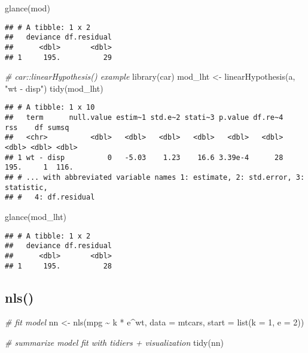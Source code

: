 \documentclass[
]{book}
\newenvironment{Shaded}{\begin{snugshade}}{\end{snugshade}}
\newcommand{\AttributeTok}[1]{\textcolor[rgb]{0.77,0.63,0.00}{#1}}
\newcommand{\CommentTok}[1]{\textcolor[rgb]{0.56,0.35,0.01}{\textit{#1}}}
\newcommand{\DecValTok}[1]{\textcolor[rgb]{0.00,0.00,0.81}{#1}}
\newcommand{\FunctionTok}[1]{\textcolor[rgb]{0.00,0.00,0.00}{#1}}
\newcommand{\NormalTok}[1]{#1}
\newcommand{\OtherTok}[1]{\textcolor[rgb]{0.56,0.35,0.01}{#1}}
\newcommand{\SpecialCharTok}[1]{\textcolor[rgb]{0.00,0.00,0.00}{#1}}
\newcommand{\StringTok}[1]{\textcolor[rgb]{0.31,0.60,0.02}{#1}}
\begin{document}
\begin{Shaded}
\begin{Highlighting}[]
\FunctionTok{glance}\NormalTok{(mod)}
\end{Highlighting}
\end{Shaded}

\begin{verbatim}
## # A tibble: 1 x 2
##   deviance df.residual
##      <dbl>       <dbl>
## 1     195.          29
\end{verbatim}

\begin{Shaded}
\begin{Highlighting}[]
\CommentTok{\# car::linearHypothesis() example}
\FunctionTok{library}\NormalTok{(car)}
\NormalTok{mod\_lht }\OtherTok{\textless{}{-}} \FunctionTok{linearHypothesis}\NormalTok{(a, }\StringTok{"wt {-} disp"}\NormalTok{)}
\FunctionTok{tidy}\NormalTok{(mod\_lht)}
\end{Highlighting}
\end{Shaded}

\begin{verbatim}
## # A tibble: 1 x 10
##   term      null.value estim~1 std.e~2 stati~3 p.value df.re~4   rss    df sumsq
##   <chr>          <dbl>   <dbl>   <dbl>   <dbl>   <dbl>   <dbl> <dbl> <dbl> <dbl>
## 1 wt - disp          0   -5.03    1.23    16.6 3.39e-4      28  195.     1  116.
## # ... with abbreviated variable names 1: estimate, 2: std.error, 3: statistic,
## #   4: df.residual
\end{verbatim}

\begin{Shaded}
\begin{Highlighting}[]
\FunctionTok{glance}\NormalTok{(mod\_lht)}
\end{Highlighting}
\end{Shaded}

\begin{verbatim}
## # A tibble: 1 x 2
##   deviance df.residual
##      <dbl>       <dbl>
## 1     195.          28
\end{verbatim}

\hypertarget{nls}{%
\subsection{nls()}\label{nls}}

\begin{Shaded}
\begin{Highlighting}[]
\CommentTok{\# fit model}
\NormalTok{nn }\OtherTok{\textless{}{-}} \FunctionTok{nls}\NormalTok{(mpg }\SpecialCharTok{\textasciitilde{}}\NormalTok{ k }\SpecialCharTok{*}\NormalTok{ e}\SpecialCharTok{\^{}}\NormalTok{wt, }\AttributeTok{data =}\NormalTok{ mtcars, }\AttributeTok{start =} \FunctionTok{list}\NormalTok{(}\AttributeTok{k =} \DecValTok{1}\NormalTok{, }\AttributeTok{e =} \DecValTok{2}\NormalTok{))}

\CommentTok{\# summarize model fit with tidiers + visualization}
\FunctionTok{tidy}\NormalTok{(nn)}
\end{Highlighting}
\end{Shaded}
\end{document}
